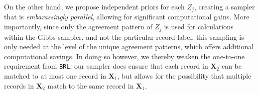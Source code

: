 \documentclass[12pt,letterpaper]{article}
\newcommand{\1}[1]{\mathbb{I}\!\left[#1\right]} %
\begin{document}
On the other hand, we propose independent priors for each \(Z_j\), creating a sampler that is \emph{embarassingly parallel}, allowing for significant computational gains. More importantly, since only the agreement pattern of \(Z_j\) is used for
calculations within the Gibbs sampler, and not the particular record
label, this sampling is only needed at the level of the unique agreement patterns, which offers additional computational savings.  In doing so however, we thereby weaken the one-to-one requirement from
\texttt{BRL}; our sampler does ensure that each record in \(\bm{X}_2\) can be
matched to at most one record in \(\bm{X}_1\), but allows for the possibility
that multiple records in \(\bm{X}_2\) match to the same record in \(\bm{X}_1\).

\newpage


\end{document}
